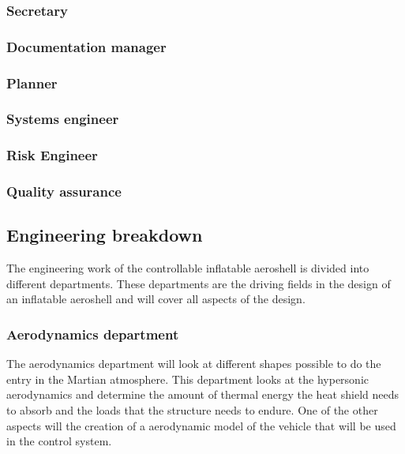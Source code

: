 \subsubsection{Secretary}\label{subsec:Secretary}


\subsubsection{Documentation manager}\label{subsec:D_and_A}


\subsubsection{Planner}\label{subsec:Planner}


\subsubsection{Systems engineer}\label{subsec:SE}


\subsubsection{Risk Engineer}\label{subsec:RiskEng}


\subsubsection{Quality assurance}\label{subsec:QA}


\subsection{Engineering breakdown}\label{subsec:engineer}
The engineering work of the controllable inflatable aeroshell is divided into different departments. These departments are the driving fields in the design of an inflatable aeroshell and will cover all aspects of the design.

\subsubsection{Aerodynamics department}\label{subsec:aero}
The aerodynamics department will look at different shapes possible to do the entry in the Martian atmosphere. This department looks at the hypersonic aerodynamics and determine the amount of thermal energy the heat shield needs to absorb and the loads that the structure needs to endure. One of the other aspects will the creation of a aerodynamic model of the vehicle that will be used in the control system.

